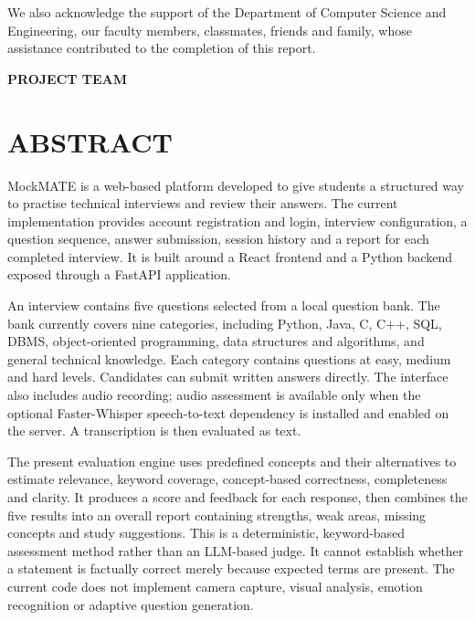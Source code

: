 \documentclass[12pt,a4paper,oneside]{report}
\begin{document}
We also acknowledge the support of the Department of Computer Science and Engineering, our faculty members, classmates, friends and family, whose assistance contributed to the completion of this report.

\vspace{1cm}
\begin{flushright}
\textbf{PROJECT TEAM}
\end{flushright}
\clearpage

\chapter*{ABSTRACT}
\thispagestyle{plain}
MockMATE is a web-based platform developed to give students a structured way to practise technical interviews and review their answers. The current implementation provides account registration and login, interview configuration, a question sequence, answer submission, session history and a report for each completed interview. It is built around a React frontend and a Python backend exposed through a FastAPI application.

An interview contains five questions selected from a local question bank. The bank currently covers nine categories, including Python, Java, C, C++, SQL, DBMS, object-oriented programming, data structures and algorithms, and general technical knowledge. Each category contains questions at easy, medium and hard levels. Candidates can submit written answers directly. The interface also includes audio recording; audio assessment is available only when the optional Faster-Whisper speech-to-text dependency is installed and enabled on the server. A transcription is then evaluated as text.

The present evaluation engine uses predefined concepts and their alternatives to estimate relevance, keyword coverage, concept-based correctness, completeness and clarity. It produces a score and feedback for each response, then combines the five results into an overall report containing strengths, weak areas, missing concepts and study suggestions. This is a deterministic, keyword-based assessment method rather than an LLM-based judge. It cannot establish whether a statement is factually correct merely because expected terms are present. The current code does not implement camera capture, visual analysis, emotion recognition or adaptive question generation.
\end{document}

